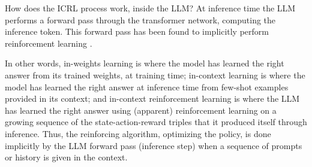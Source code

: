 How does the ICRL process work, inside the LLM? At
inference time the LLM performs a forward pass through the transformer network, computing the inference token. This forward pass has been found to    
implicitly perform reinforcement learning \citep{wang2024transformers}. 
%

%
In other words, 
in-weights learning is where the model has learned the right answer from its trained weights, at training time;
in-context learning is where the model has learned the right answer at inference time from few-shot examples provided in its context; and
in-context reinforcement learning is where the LLM has learned the right answer using (apparent) reinforcement learning on a growing sequence of the state-action-reward triples that it produced itself through inference. Thus, the reinforcing algorithm, optimizing the policy, is done implicitly by the LLM forward pass (inference step) when a sequence of prompts or history is given in the context. 


